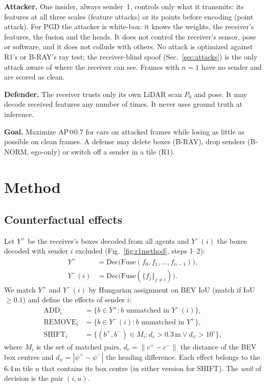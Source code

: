 \documentclass[conference]{IEEEtran}
\begin{document}
\textbf{Attacker.} One insider, always sender~1, controls only what it transmits: its features at all three
scales (feature attacks) or its points before encoding (point attack). For PGD the attacker is white-box:
it knows the weights, the receiver's features, the fusion and the heads. It does not control the receiver's
sensor, pose or software, and it does not collude with others. No attack is optimized against R1's or B-RAY's
ray test; the receiver-blind spoof (Sec.~\ref{sec:attacks}) is the only attack aware of where the receiver can
see. Frames with $n=1$ have no sender and are scored as clean.

\textbf{Defender.} The receiver trusts only its own LiDAR scan $P_0$ and pose. It may decode received features
any number of times. It never uses ground truth at inference.

\textbf{Goal.} Maximize AP@0.7 for cars on attacked frames while losing as little as possible on clean
frames. A defense may delete boxes (B-RAY), drop senders (B-NORM, ego-only) or switch off a sender in a tile
(R1).

\section{Method}
\label{sec:method}


\subsection{Counterfactual effects}
Let $Y^{+}$ be the receiver's boxes decoded from all agents and $Y^{-}(i)$ the boxes decoded with sender
$i$ excluded (Fig.~\ref{fig:r1method}, steps 1--2):
\begin{equation}
\begin{split}
Y^{+}&=\mathrm{Dec}\big(\mathrm{Fuse}(f_0,f_1,\dots,f_{n-1})\big),\\
Y^{-}(i)&=\mathrm{Dec}\big(\mathrm{Fuse}(\{f_j\}_{j\neq i})\big).
\end{split}
\label{eq:cf}
\end{equation}
We match $Y^{+}$ and $Y^{-}(i)$ by Hungarian assignment on BEV IoU (match if IoU${}\ge 0.1$) and define the
effects of sender $i$:
\begin{equation}
\begin{split}
\mathrm{ADD}_i&=\{b\in Y^{+} : b \text{ unmatched in } Y^{-}(i)\},\\
\mathrm{REMOVE}_i&=\{b\in Y^{-}(i) : b \text{ unmatched in } Y^{+}\},\\
\mathrm{SHIFT}_i&=\{(b^{+},b^{-})\in M_i : d_c>0.3\,\text{m} \lor d_\psi>10^\circ\},
\end{split}
\label{eq:effects}
\end{equation}
where $M_i$ is the set of matched pairs, $d_c=\|c^{+}-c^{-}\|$ the distance of the BEV box centres and $d_\psi=|\psi^{+}-\psi^{-}|$ the heading
difference. Each effect belongs to the 6.4\,m tile $u$ that contains its box centre (in either version for
SHIFT). The \emph{unit} of decision is the pair $(i,u)$.
\end{document}
